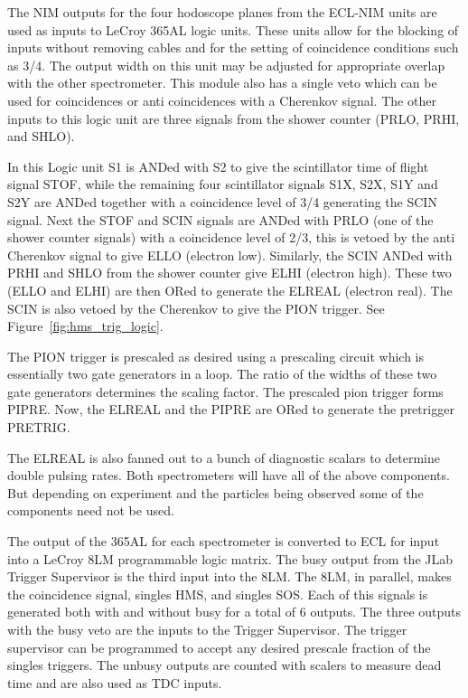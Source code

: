 The NIM outputs for the four hodoscope planes from the ECL-NIM units are
used as inputs to LeCroy 365AL logic units. These units allow for the
blocking of inputs without removing cables and for the setting of coincidence
conditions such as 3/4. The output width on this unit may be adjusted for
appropriate overlap with the other spectrometer. This module also has a
single veto which can be used for coincidences or anti coincidences with a
Cherenkov signal. The other inputs to this logic unit are three signals
from the shower counter (PRLO, PRHI, and SHLO).

In this Logic unit S1 is ANDed with S2 to give the scintillator time of flight
signal STOF, while the remaining four scintillator signals S1X, S2X, S1Y and S2Y
are ANDed together with a coincidence level of 3/4 generating the SCIN
signal. Next the STOF and SCIN signals are ANDed with PRLO (one of the shower
counter signals) with a coincidence level of 2/3, this is vetoed by the
anti Cherenkov signal to give ELLO (electron low). Similarly, the SCIN ANDed with
PRHI and SHLO from the shower counter give  ELHI (electron high). These two
(ELLO and ELHI) are then ORed to generate the ELREAL (electron real). The SCIN
is also vetoed by the Cherenkov to give the PION trigger. See Figure~\ref{fig:hms_trig_logic}.

The PION trigger is
prescaled as desired using a prescaling circuit which is essentially two gate
generators in a loop. The ratio of the widths of these two gate generators
determines the scaling factor. The prescaled pion trigger forms PIPRE. Now, the
ELREAL and the PIPRE are ORed to generate the pretrigger PRETRIG.

The ELREAL is also fanned out to a bunch of diagnostic scalars to
determine double pulsing rates. Both spectrometers will have all
of the above components. But depending on experiment and the particles
being observed some of the components need not be used.

The output of the 365AL for each spectrometer is converted to ECL for
input into a LeCroy 8LM programmable logic matrix. The busy output from
the JLab Trigger Supervisor is the third input into the 8LM.  The
8LM, in parallel, makes the coincidence signal, singles HMS, and
singles SOS.  Each of this signals is generated both with and without
busy for a total of 6 outputs. The three outputs with the busy veto are
the inputs to the Trigger Supervisor. The trigger supervisor can be programmed
to accept any desired prescale fraction of the singles triggers. The unbusy
outputs are counted with scalers to measure dead time and are also used as TDC
inputs.

